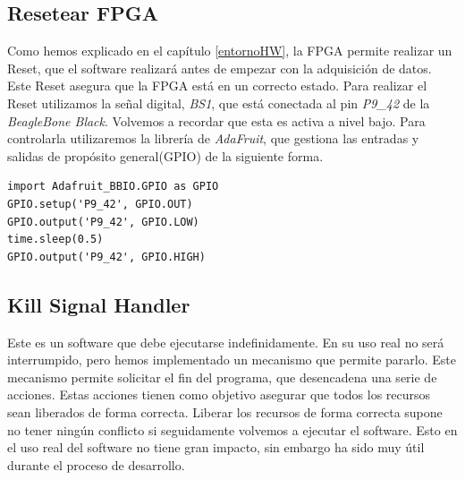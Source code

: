 	\subsection{Resetear FPGA}
		Como hemos explicado en el capítulo \ref{entornoHW}, la FPGA permite realizar un Reset, que el software realizará antes de empezar con
		la adquisición de datos. Este Reset asegura que la FPGA está en un correcto estado. Para realizar el Reset utilizamos la señal
		digital, \emph{BS1}, que está conectada al pin \emph{P9\_42} de la \emph{BeagleBone Black}. Volvemos a recordar que esta es activa a nivel
		bajo. Para controlarla utilizaremos la librería de \emph{AdaFruit}\cite{AdaFruitGit}, que gestiona las entradas y salidas de propósito
		general(GPIO) de la siguiente forma.
		\begin{lstlisting}[style=myPython]
import Adafruit_BBIO.GPIO as GPIO
GPIO.setup('P9_42', GPIO.OUT)
GPIO.output('P9_42', GPIO.LOW)
time.sleep(0.5)
GPIO.output('P9_42', GPIO.HIGH)
		\end{lstlisting}
	
	\subsection{Kill Signal Handler}
		Este es un software que debe ejecutarse indefinidamente. En su uso real no será interrumpido, pero hemos implementado un mecanismo que
		permite pararlo. Este mecanismo permite solicitar el fin del programa, que desencadena una serie de acciones. Estas acciones tienen
		como objetivo asegurar que todos los recursos sean liberados de forma correcta. Liberar los recursos de forma correcta supone no tener
		ningún conflicto si seguidamente volvemos a ejecutar el software. Esto en el uso real del software no tiene gran impacto, sin embargo
		ha sido muy útil durante el proceso de desarrollo.

